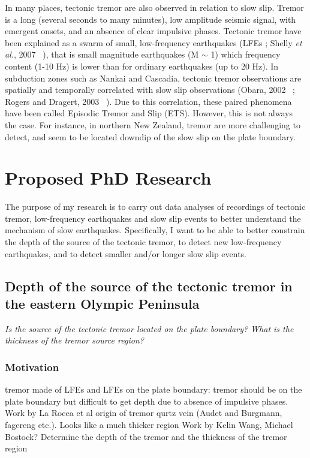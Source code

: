 \documentclass[letterpaper, 12pt]{article}
\begin{document}
In many places, tectonic tremor are also observed in relation to slow slip. Tremor is a long (several seconds to many minutes), low amplitude seismic signal, with emergent onsets, and an absence of clear impulsive phases. Tectonic tremor have been explained as a swarm of small, low-frequency earthquakes (LFEs ; Shelly \textit{et al.}, 2007 ~\cite{SHE_2007_nature}), that is small magnitude earthquakes (M $\sim$ 1) which frequency content (1-10 Hz) is lower than for ordinary earthquakes (up to 20 Hz). In subduction zones such as Nankai and Cascadia, tectonic tremor observations are spatially and temporally correlated with slow slip observations (Obara, 2002 ~\cite{OBA_2002}; Rogers and Dragert, 2003 ~\cite{ROG_2003}). Due to this correlation, these paired phenomena have been called Episodic Tremor and Slip (ETS). However, this is not always the case. For instance, in northern New Zealand, tremor are more challenging to detect, and seem to be located downdip of the slow slip on the plate boundary.

\section{Proposed PhD Research}

The purpose of my research is to carry out data analyses of recordings of tectonic tremor, low-frequency earthquakes and slow slip events to better understand the mechanism of slow earthquakes. Specifically, I want to be able to better constrain the depth of the source of the tectonic tremor, to detect new low-frequency earthquakes, and to detect smaller and/or longer slow slip events.

\subsection{Depth of the source of the tectonic tremor in the eastern Olympic Peninsula}

\textit{Is the source of the tectonic tremor located on the plate boundary? What is the thickness of the tremor source region?}

\subsubsection*{Motivation}

tremor made of LFEs and LFEs on the plate boundary: tremor should be on the plate boundary but difficult to get depth due to absence of impulsive phases. 
Work by La Rocca et al
origin of tremor qurtz vein (Audet and Burgmann, fagereng etc.). Looks like a much thicker region
Work by Kelin Wang, Michael Bostock?
Determine the depth of the tremor and the thickness of the tremor region
\end{document}
